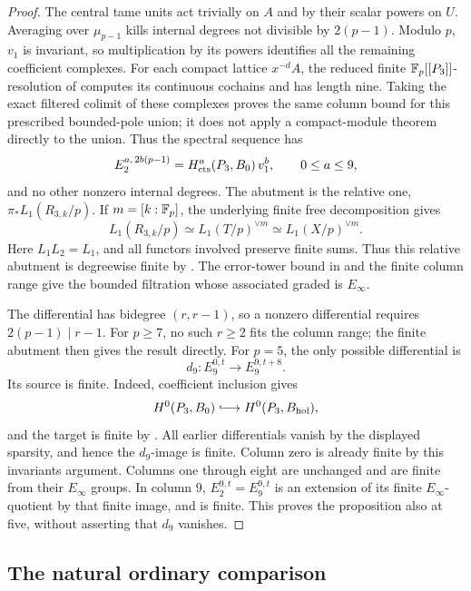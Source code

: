 \begin{proof}
The central tame units act trivially on \(A\) and by their
scalar powers on \(U\).  Averaging over \(\mu_{p-1}\) kills
internal degrees not divisible by \(2(p-1)\).
Modulo \(p\), \(v_1\) is invariant, so multiplication by
its powers identifies all the remaining coefficient complexes.
For each compact lattice \(x^{-d}A\), the reduced finite
\(\mathbb F_p[[P_3]]\)-resolution of 
computes its continuous cochains and has length nine.  Taking the exact
filtered colimit of these complexes proves the same column bound for
this prescribed bounded-pole union; it does not apply a compact-module
theorem directly to the union.  Thus the spectral sequence has
\[
 E_2^{a,\,2b(p-1)}
       =H^a_{\mathrm{cts}}(P_3,B_0)\,v_1^b,\qquad
 0\leq a\leq9,
\]
and no other nonzero internal degrees.  The abutment is the relative
one, \(\pi_*L_1(R_{3,k}/p)\).  If \(m=[k:\mathbb F_p]\), the underlying
finite free decomposition gives
\[
 L_1(R_{3,k}/p)\simeq L_1(T/p)^{\vee m}
       \simeq L_1(X/p)^{\vee m}.
\]
Here \(L_1L_2=L_1\), and all functors involved preserve finite sums.
Thus this relative abutment is degreewise finite by
.  The error-tower bound in
 and the finite column range give the
bounded filtration whose associated graded is \(E_\infty\).

The differential has bidegree \((r,r-1)\), so a nonzero
differential requires \(2(p-1)\mid r-1\).
For \(p\geq7\), no such \(r\geq2\) fits the column range;
the finite abutment then gives the result directly.
For \(p=5\), the only possible differential is
\[
 d_9:E_9^{0,t}\longrightarrow E_9^{9,t+8}.
\]
Its source is finite.  Indeed, coefficient inclusion gives
\[
 H^0(P_3,B_0)\lhook\joinrel\longrightarrow
 H^0(P_3,B_{\hthreehol}),
\]
and the target is finite by
.
All earlier differentials vanish by the displayed sparsity,
and hence the \(d_9\)-image is finite.  Column zero is already finite
by this invariants argument.  Columns one through eight are unchanged
and are finite from their \(E_\infty\) groups.  In column \(9\),
\(E_2^{9,t}=E_9^{9,t}\) is an extension of its finite
\(E_\infty\)-quotient by that finite image, and is finite.
This proves the proposition also at five, without asserting
that \(d_9\) vanishes.
\end{proof}

\subsection{The natural ordinary comparison}
\label{h3:sec:ordinary-comparison}

